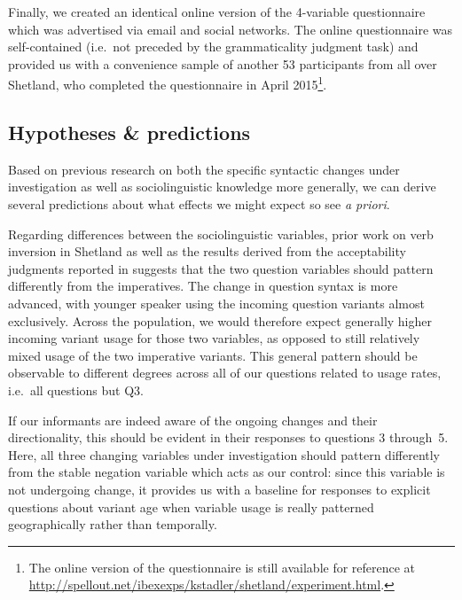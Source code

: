 Finally, we created an identical online version of the 4-variable questionnaire which was advertised via email and social networks. The online questionnaire was self-contained (i.e.~not preceded by the grammaticality judgment task) and provided us with a convenience sample of another 53 participants from all over Shetland, who completed the questionnaire in April 2015\footnote{The online version of the questionnaire is still available for reference at \url{http://spellout.net/ibexexps/kstadler/shetland/experiment.html}.}.

\subsection{Hypotheses \& predictions}\label{sec:questionnairepredictions}

Based on previous research on both the specific syntactic changes under investigation as well as sociolinguistic knowledge more generally, we can derive several predictions about what effects we might expect so see \emph{a priori}.

Regarding differences between the sociolinguistic variables, prior work on verb inversion in Shetland as well as the results derived from the acceptability judgments reported in \citet{Jamieson2015} suggests that the two question variables should pattern differently from the imperatives. The change in question syntax is more advanced, with younger speaker using the incoming question variants almost exclusively. Across the population, we would therefore expect generally higher incoming variant usage for those two variables, as opposed to still relatively mixed usage of the two imperative variants. This general pattern should be observable to different degrees across all of our questions related to usage rates, i.e.~all questions but Q3.

If our informants are indeed aware of the ongoing changes and their directionality, this should be evident in their responses to questions 3 through~5. Here, all three changing variables under investigation should pattern differently from the stable negation variable which acts as our control: since this variable is not undergoing change, it provides us with a baseline for responses to explicit questions about variant age when variable usage is really patterned geographically rather than temporally. %


